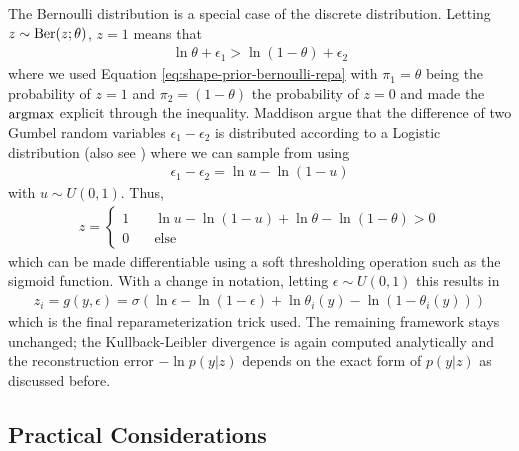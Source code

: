 The Bernoulli distribution is a special case of the discrete distribution.
Letting $z \sim \mathrm{Ber}(z;\theta)$, $z = 1$ means that
\begin{align}
  \ln \theta + \epsilon_1 > \ln (1 - \theta) + \epsilon_2
\end{align}
where we used Equation \eqref{eq:shape-prior-bernoulli-repa} with $\pi_1 = \theta$
being the probability of $z = 1$ and $\pi_2 = (1 - \theta)$ the probability of $z = 0$
and made the $\operatorname*{argmax}$ explicit through the inequality.
Maddison \etal \cite{MaddisonMnihTeh:2016} argue that the difference
of two Gumbel random variables $\epsilon_1 - \epsilon_2$ is distributed according
to a Logistic distribution (also see \cite[Section~5]{BenAkivaLerman:1985}) where
we can sample from using
\begin{align}
  \epsilon_1 - \epsilon_2 = \ln u - \ln (1 - u)
\end{align}
with $u \sim U(0,1)$. Thus,
\begin{align}
  z = \begin{cases}
    1&\quad\ln u - \ln (1 - u) + \ln \theta - \ln (1 - \theta) > 0\\
    0&\quad\text{else}
  \end{cases}
\end{align}
which can be made differentiable using a soft thresholding operation
such as the sigmoid function.
With a change in notation, letting $\epsilon \sim U(0,1)$ this results in
\begin{align}
  z_i = g(y, \epsilon) = \sigma\left(\ln \epsilon - \ln (1 - \epsilon) + \ln \theta_i(y) - \ln (1 - \theta_i(y))\right)
  \label{eq:shape-prior-reparameterization-bernoulli}
\end{align}
which is the final reparameterization trick used. The remaining framework stays
unchanged; the Kullback-Leibler divergence is again computed analytically
and the reconstruction error $- \ln p(y | z)$ depends on the exact form
of $p(y |z)$ as discussed before.

\subsection{Practical Considerations}
\label{sec:shape-prior-vae-practical-considerations}

